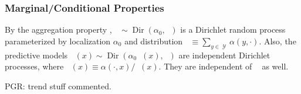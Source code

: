\documentclass{article}
\DeclareMathOperator{\xrm}{\mathrm{x}}
\DeclareMathOperator{\prm}{\mathrm{p}}
\DeclareMathOperator{\Xcal}{\mathcal{X}}
\DeclareMathOperator{\Ycal}{\mathcal{Y}}
\DeclareMathOperator{\Dir}{\mathrm{Dir}}
\DeclareMathOperator{\upthetam}{\uptheta_\text{m}}
\DeclareMathOperator{\upthetac}{\uptheta_\text{c}}
\DeclareMathOperator{\alpham}{\alpha_\text{m}}
\DeclareMathOperator{\alphac}{\alpha_\text{c}}
\begin{document}
\subsubsection{Marginal/Conditional Properties}

By the aggregation property \cite{ferguson}, $\upthetam \sim \Dir(\alpha_0,\alpham)$ is a Dirichlet random process parameterized by localization $\alpha_0$ and distribution $\alpham \equiv \sum_{y \in \Ycal} \alpha(y,\cdot)$. Also, the predictive models $\upthetac(x) \sim \Dir(\alpha_0 \alpham(x),\alphac)$ are independent Dirichlet processes, where $\alphac(x) \equiv \alpha(\cdot,x) / \alpham(x)$. They are independent of $\upthetam$ as well. 




PGR: trend stuff commented.
%
%
\end{document}
